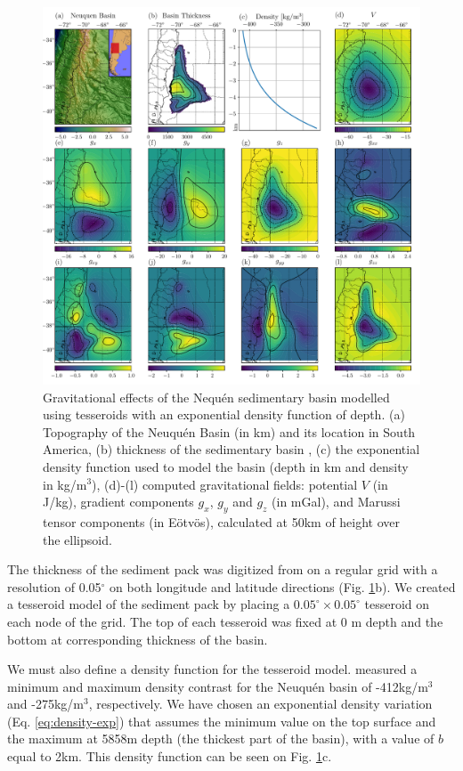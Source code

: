 \documentclass[extra]{gji}
\begin{document}
\begin{figure}
\centering
\includegraphics[width=\linewidth]{figures/neuquen-basin.pdf}
\caption{
    Gravitational effects of the Nequ\'en sedimentary basin modelled
    using tesseroids with an exponential density function of depth.
    (a) Topography of the Neuqu\'en Basin (in km) and its location in South America,
    (b) thickness of the sedimentary basin \citep[in meters;][]{Heine2007},
    (c) the exponential density function used to model the basin
        (depth in km and density in kg/m$^3$),
    (d)-(l) computed gravitational fields: potential $V$ (in J/kg), gradient
    components $g_x$, $g_y$ and $g_z$ (in mGal), and Marussi tensor components
    (in Eötvös), calculated at 50km of height over the ellipsoid.
}
\label{fig:neuquen-basin}
\end{figure}

The thickness of the sediment pack was digitized from \citet{Heine2007} on a regular
grid with a resolution of 0.05$^\circ$ on both longitude and latitude directions
(Fig. \ref{fig:neuquen-basin}b).
We created a tesseroid model of the sediment pack by placing a
$0.05^\circ \times 0.05^\circ$ tesseroid on each node of the grid.
The top of each tesseroid was fixed at 0 m depth and the bottom at corresponding
thickness of the basin.

We must also define a density function for the tesseroid model.
\citet{Sigismondi2012} measured a minimum and maximum density contrast for
the Neuqu\'en basin of -412kg/m$^3$ and -275kg/m$^3$, respectively.
We have chosen an exponential density variation (Eq. \ref{eq:density-exp}) that assumes
the minimum value on the top surface and the maximum at 5858m depth (the thickest part
of the basin), with a value of $b$ equal to 2km.
This density function can be seen on Fig. \ref{fig:neuquen-basin}c.
\end{document}
